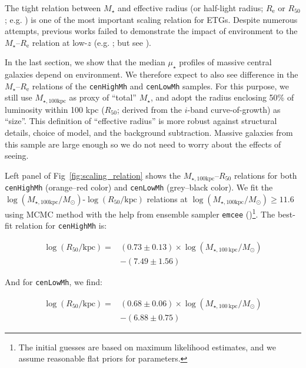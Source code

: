 \documentclass[a4paper,fleqn,usenatbib]{mnras}
\def\rbcg{\texttt{cenHighMh}}
\def\nbcg{\texttt{cenLowMh}}
\def\mstar{{$M_{\star}$}}
\def\mtot{{$M_{\star,100\mathrm{kpc}}$}}
\def\logmtot{{$\log (M_{\star,100\mathrm{kpc}}/M_{\odot})$}}
\def\mden{{$\mu_{\star}$}}
\begin{document}
    The tight relation between \mstar{} and effective radius (or half-light radius; 
    $R_{\mathrm{e}}$ or $R_{\mathrm{50}}$; e.g. \citealt{Shankar2013, Leja2013, 
    vdWel2014}) is one of the most important scaling relation for ETGs. 
    Despite numerous attempts, previous works failed to demonstrate the impact of 
    environment to the \mstar{}--$R_{\mathrm{e}}$ relation at low-$z$ 
    (e.g. \citealt{Weinmann2009, Nair2010, HCompany13, Cerbrian2014}; 
    but see \citealt{Yoon2017}). 
    
    In the last section, we show that the median \mden{} profiles of massive central 
    galaxies depend on environment. 
    We therefore expect to also see difference in the \mstar{}--$R_{\mathrm{e}}$ 
    relations of the \rbcg{} and \nbcg{} samples. 
    For this purpose, we still use \mtot{} as proxy of ``total'' \mstar{}, and adopt 
    the radius enclosing 50\% of luminosity within 100 kpc ($R_{\mathrm{50}}$; derived 
    from the $i$-band curve-of-growth) as ``size''. 
    This definition of ``effective radius'' is more robust against structural details, 
    choice of model, and the background subtraction. 
    Massive galaxies from this sample are large enough so we do not need to worry 
    about the effects of seeing.
    
    Left panel of Fig~\ref{fig:scaling_relation} shows the \mtot{}--$R_{\mathrm{50}}$
    relations for both \rbcg{} (orange--red color) and \nbcg{} (grey--black color). 
    We fit the \logmtot{}-$\log (R_{\mathrm{50}}/\mathrm{kpc})$ relations at 
    \logmtot{}$\geq 11.6$ using MCMC method with the help from ensemble sampler 
    \texttt{emcee} (\citealt{Emcee})\footnote{The initial guesses are based on maximum 
    likelihood estimates, and we assume reasonable flat priors for parameters.}.
    The best-fit relation for \rbcg{} is:
    
    \begin{equation}
        \begin{aligned}
        \log (R_{\mathrm{50}}/\mathrm{kpc}) = & (0.73\pm0.13) \times \log (M_{\star, 100\ \mathrm{kpc}}/M_{\odot}) \\ & -(7.49\pm1.56)
        \end{aligned}
    \end{equation}

    \noindent And for \nbcg{}, we find:
    
    \begin{equation}
        \begin{aligned}
        \log (R_{\mathrm{50}}/\mathrm{kpc}) = & (0.68\pm0.06) \times \log (M_{\star, 100\ \mathrm{kpc}}/M_{\odot}) \\ & -(6.88\pm0.75)
        \end{aligned}
    \end{equation}
    
\end{document}
